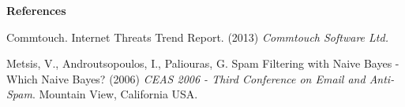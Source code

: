 \documentclass[12pt]{article}
\begin{document}
\begin{flushleft}
\textbf{References}
\end{flushleft}

\begin{flushleft}
Commtouch.  Internet Threats Trend Report. (2013) \textit{Commtouch Software Ltd.}
\end{flushleft}

\begin{flushleft}
Metsis, V., Androutsopoulos, I., Paliouras, G.  Spam Filtering with Naive Bayes - Which Naive Bayes?
(2006)  \textit{CEAS 2006 - Third Conference on Email and Anti-Spam}. Mountain View, California USA.
\end{flushleft}
\end{document}
